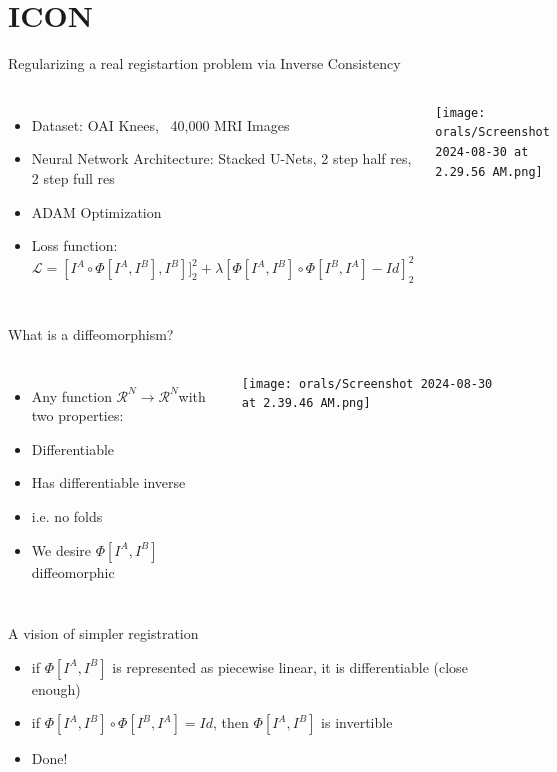 \documentclass{beamer}
\begin{document}
\section{ICON}
\begin{frame}{Regularizing a real registartion problem via Inverse Consistency}
	\begin{columns}
        \begin{itemize}
            \item Dataset: OAI Knees, ~40,000 MRI Images
		   \item Neural Network Architecture: Stacked U-Nets, 2 step half res, 2 step full res
		   \item ADAM Optimization
		   \item Loss function: $\mathcal{L} = [I^A \circ \Phi[I^A, I^B], I^B]]^2_2 + \lambda [\Phi[I^A, I^B] \circ \Phi[I^B, I^A] - Id ]^2_2$
        \end{itemize}
		\texttt{[image: orals/Screenshot 2024-08-30 at 2.29.56 AM.png]}
	\end{columns}
\end{frame}


\begin{frame}{What is a diffeomorphism?}
	\begin{columns}
		\column{.5\textwidth}
	\begin{itemize}
		\item Any function $\mathcal{R}^N \rightarrow \mathcal{R}^N $with two properties:
		\item Differentiable
		\item Has differentiable inverse
		\item i.e. no folds
		\item We desire $\Phi[I^A, I^B]$ diffeomorphic

	\end{itemize}
	
		\column{.5\textwidth}

		\texttt{[image: orals/Screenshot 2024-08-30 at 2.39.46 AM.png]}
	\end{columns}
\end{frame}

\begin{frame}{A vision of simpler registration}
	\begin{itemize}
		\item if $\Phi[I^A, I^B]$ is represented as piecewise linear, it is differentiable (close enough)
		\item if $\Phi[I^A, I^B] \circ \Phi[I^B, I^A] = Id$, then $\Phi[I^A, I^B]$ is invertible
		\item Done!
	\end{itemize}
\end{frame}
\end{document}
